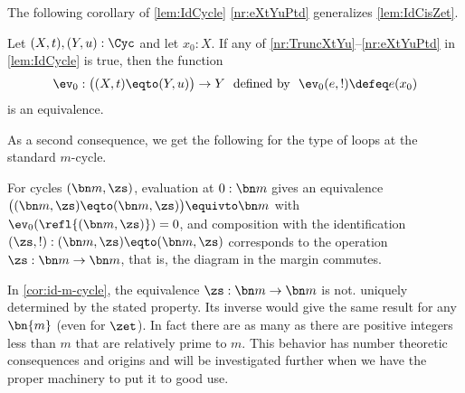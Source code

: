 The following corollary of \cref{lem:IdCycle} \ref{nr:eXtYuPtd} 
generalizes \cref{lem:IdCisZet}.

\begin{corollary}\label{cor:ConnCycles} 
  Let $(X,t),(Y,u):\Cyc$ and let $x_0:X$.
  If any of \ref{nr:TruncXtYu}--\ref{nr:eXtYuPtd} in \cref{lem:IdCycle} is
  true, then the function
  \[
    \ev_0:\bigl((X,t)\eqto(Y,u)\bigr)\to Y
    \text{~~defined by~~} \ev_0(e,!) \defeq e(x_0)
  \]
  is an equivalence.
\end{corollary}

As a second consequence,
we get the following for the type of loops at the standard $m$-cycle.
\begin{corollary}\label{cor:id-m-cycle}
  For cycles $(\bn m,\zs)$,
  evaluation at $0:\bn m$ gives an equivalence
  $\bigl((\bn m,\zs)\eqto(\bn m,\zs)\bigr) \equivto \bn m$
  with $\ev_0(\refl{(\bn m,\zs)}) = 0$, and
  composition with the identification
$(\zs,!): (\bn m,\zs)\eqto(\bn m,\zs)$
  corresponds to the operation $\zs:\bn m\to\bn m$,
  that is, the diagram in the margin commutes.
\end{corollary}

\begin{remark}\label{rem:thenonuniquenessofgeneratorsofmodulararithmetic1}
  In \cref{cor:id-m-cycle}, the equivalence $\zs:\bn m\to\bn m$ is not.
  uniquely determined by the stated property. Its inverse would give the
  same result for any $\bn{m}$ (even for $\zet$). In fact there are
  as many as there are positive integers less than
  $m$ that are relatively prime to $m$.  This behavior has number theoretic
  consequences and origins and will be investigated further when we
  have the proper machinery to put it to good use.
\end{remark}

